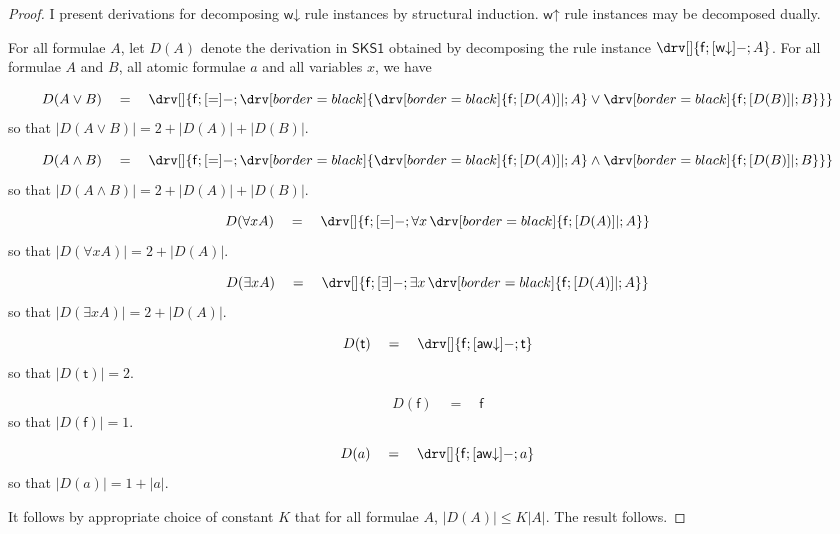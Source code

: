 \documentclass[10pt]{article}
\theoremstyle{definition}\newtheorem{remark}[theorem]{Remark}
\theoremstyle{definition}\newtheorem{example}[theorem]{Example}
\theoremstyle{definition}\newtheorem{definition}[theorem]{Definition}
\newcommand{\SKSqDecomp}{{\mathsf{SKS1}}}
\newcommand{\awDown}{{\mathsf{aw\mathord\downarrow}}}
\newcommand{\wUp}{{\mathsf{w\mathord\uparrow}}}
\newcommand{\wDown}{{\mathsf{w\mathord\downarrow}}}
\newcommand{\trueUnit}{\mathsf{t}}
\newcommand{\falseUnit}{\mathsf{f}}
\begin{document}
	\begin{proof}
		I present derivations for decomposing $\wDown$ rule instances by structural induction. $\wUp$ rule instances may be decomposed dually.
		
		For all formulae $A$, let $D(A)$ denote the derivation in $\SKSqDecomp$ obtained by decomposing the rule instance $\drv[] {\falseUnit ; [\wDown]- ; A}$. For all formulae $A$ and $B$, all atomic formulae $a$ and all variables $x$, we have
		
		\[
		D(A \lor B) \hspace{1em} = \hspace{1em} \drv[] {
			\falseUnit ; [=]- ; \drv[border=black] {
				\drv[border=black] {
					\falseUnit ; [D(A)]| ; A
				} \lor \drv[border=black] {
					\falseUnit ; [D(B)]| ; B
				}
			}
		}
		\]
		so that $| D(A \lor B) | = 2 + | D(A) | + | D(B) |$.
		
		\[
		D(A \land B) \hspace{1em} = \hspace{1em} \drv[] {
			\falseUnit ; [=]- ; \drv[border=black] {
				\drv[border=black] {
					\falseUnit ; [D(A)]| ; A
				} \land \drv[border=black] {
					\falseUnit ; [D(B)]| ; B
				}
			}
		}
		\]
		so that $| D(A \land B) | = 2 + | D(A) | + | D(B) |$.
		
		\[
		D(\forall x A) \hspace{1em} = \hspace{1em} \drv[] {
			\falseUnit ; [=]- ; \forall x \, \drv[border=black] {
				\falseUnit ; [D(A)]| ; A
			}
		}
		\]
		so that $| D(\forall x A) | = 2 + | D(A) |$.
		
		\[
		D(\exists x A) \hspace{1em} = \hspace{1em} \drv[] {
			\falseUnit ; [\exists]- ; \exists x \, \drv[border=black] {
				\falseUnit ; [D(A)]| ; A
			}
		}
		\]
		so that $| D(\exists x A) | = 2 + | D(A) |$.
		
		\[
		D(\trueUnit) \hspace{1em} = \hspace{1em} \drv[] {
			\falseUnit ; [\awDown]- ; \trueUnit
		}
		\]
		so that $| D(\trueUnit) | = 2$.
		
		\[
		D(\falseUnit) \hspace{1em} = \hspace{1em} \falseUnit
		\]
		so that $| D(\falseUnit) | = 1$.
		
		\[
		D(a) \hspace{1em} = \hspace{1em} \drv[] {
			\falseUnit ; [\awDown]- ; a
		}
		\]
		so that $| D(a) | = 1 + | a |$.
		
		It follows by appropriate choice of constant $K$ that for all formulae $A$, $| D(A) | \leq K| A |$. The result follows.
	\end{proof}
	
\end{document}
